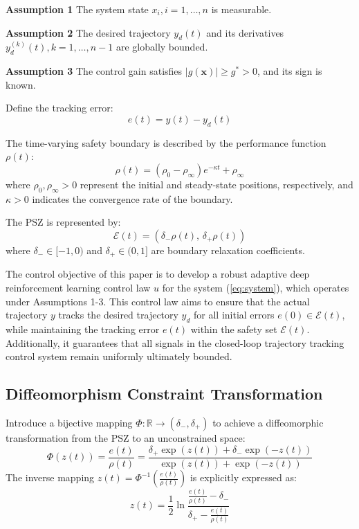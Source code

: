\documentclass[preprint,12pt]{elsarticle}
\begin{document}
\textbf{Assumption 1} The system state $x_i,i=1,\dots,n$ is measurable.

\textbf{Assumption 2} The desired trajectory $y_d(t)$ and its derivatives $y_d^{(k)}(t),k=1,\dots,n-1$ are globally bounded.

\textbf{Assumption 3} The control gain satisfies $|g(\mathbf{x})| \geq g^* > 0$, and its sign is known.

Define the tracking error:
\begin{equation}
    e(t) = y(t) - y_{d}(t)
\end{equation}

The time-varying safety boundary is described by the performance function $\rho(t)$:
\begin{equation}
    \rho(t) = (\rho_0 - \rho_\infty)e^{-\kappa t} + \rho_\infty
    \label{eq:performance_function}
\end{equation}
where $\rho_0 , \rho_\infty > 0$ represent the initial and steady-state positions, respectively, and $\kappa > 0$ indicates the convergence rate of the boundary.

The PSZ is represented by:
\begin{equation}
    \mathcal{E}(t) = \left( \delta_{-} \rho(t), \, \delta_{+}\rho(t) \right) \label{eq:psz_constraint}
\end{equation}
where $\delta_{-}\in [-1, 0)$ and $\delta_{+}\in (0, 1]$ are boundary relaxation coefficients.

The control objective of this paper is to develop a robust adaptive deep reinforcement learning control law \(u\) for the system (\ref{eq:system}), which operates under Assumptions 1-3. This control law aims to ensure that the actual trajectory \(y\) tracks the desired trajectory \(y_d\) for all initial errors \(e(0) \in \mathcal{E}(t)\), while maintaining the tracking error \(e(t)\) within the safety set \(\mathcal{E}(t)\). Additionally, it guarantees that all signals in the closed-loop trajectory tracking control system remain uniformly ultimately bounded.

\subsection{Diffeomorphism Constraint Transformation}
Introduce a bijective mapping $\Phi: \mathbb{R} \to (\delta_{-}, \delta_{+})$ to achieve a diffeomorphic transformation from the PSZ to an unconstrained space\hl{\cite{BECHLIOULIS2009532}}:
\begin{equation}
    \Phi(z(t)) = \frac{e(t)}{\rho(t)} = \frac{\delta_{+} \exp(z(t)) + \delta_{-} \exp(-z(t))}{\exp(z(t)) + \exp(-z(t))}\label{eq:diffeomorphism}
\end{equation}
The inverse mapping $z(t) = \Phi^{-1}(\frac{e(t)}{\rho(t)})$ is explicitly expressed as:
\begin{equation}
    z(t) = \frac{1}{2} \ln \frac{\frac{e(t)}{\rho(t)}-\delta_{-}}{\delta_{+}-\frac{e(t)}{\rho(t)}}\label{ztrans}
\end{equation}
\end{document}
